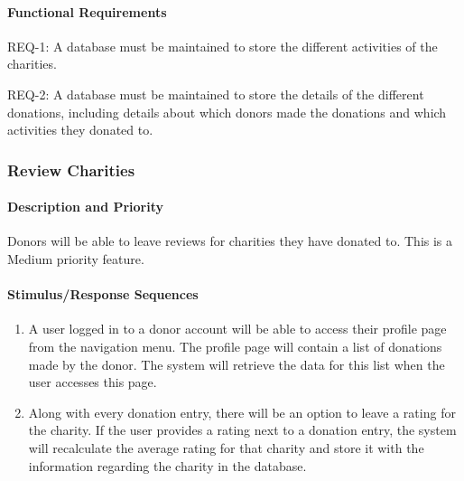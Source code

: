 \documentclass{scrreprt}
\begin{document}
            \paragraph{Functional Requirements}\mbox{}\par
                
                REQ-1:	A database must be maintained to store the different activities of the charities.\par
                
                REQ-2:	A database must be maintained to store the details of the different donations, including details about which donors made the donations and which activities they donated to.

            \subsubsection{Review Charities}

            \paragraph{Description and Priority}\mbox{}\par
            
                Donors will be able to leave reviews for charities they have donated to. This is a Medium priority feature.
            
            \paragraph{Stimulus/Response Sequences}\mbox{}\par
            
                \begin{enumerate}[label=(\alph*)]
                    \item A user logged in to a donor account will be able to access their profile page from the navigation menu. The profile page will contain a list of donations made by the donor. The system will retrieve the data for this list when the user accesses this page.
                    \item Along with every donation entry, there will be an option to leave a rating for the charity. If the user provides a rating next to a donation entry, the system will recalculate the average rating for that charity and store it with the information regarding the charity in the database.
                \end{enumerate}
            
\end{document}
